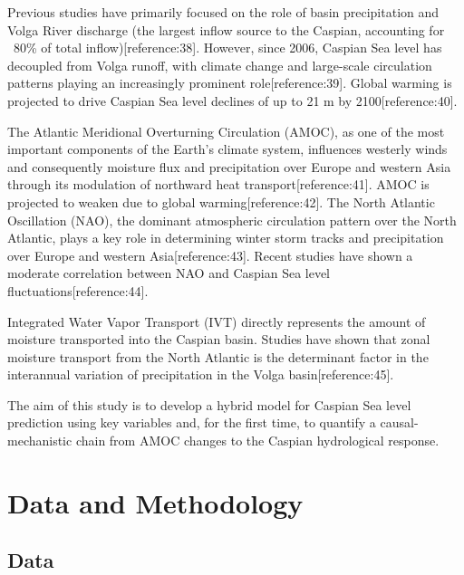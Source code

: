 \documentclass[12pt,letterpaper]{article}
\begin{document}
Previous studies have primarily focused on the role of basin precipitation and Volga River discharge (the largest inflow source to the Caspian, accounting for ~80\% of total inflow)[reference:38]. However, since 2006, Caspian Sea level has decoupled from Volga runoff, with climate change and large-scale circulation patterns playing an increasingly prominent role[reference:39]. Global warming is projected to drive Caspian Sea level declines of up to 21 m by 2100[reference:40].

The Atlantic Meridional Overturning Circulation (AMOC), as one of the most important components of the Earth's climate system, influences westerly winds and consequently moisture flux and precipitation over Europe and western Asia through its modulation of northward heat transport[reference:41]. AMOC is projected to weaken due to global warming[reference:42]. The North Atlantic Oscillation (NAO), the dominant atmospheric circulation pattern over the North Atlantic, plays a key role in determining winter storm tracks and precipitation over Europe and western Asia[reference:43]. Recent studies have shown a moderate correlation between NAO and Caspian Sea level fluctuations[reference:44].

Integrated Water Vapor Transport (IVT) directly represents the amount of moisture transported into the Caspian basin. Studies have shown that zonal moisture transport from the North Atlantic is the determinant factor in the interannual variation of precipitation in the Volga basin[reference:45].

The aim of this study is to develop a hybrid model for Caspian Sea level prediction using key variables and, for the first time, to quantify a causal-mechanistic chain from AMOC changes to the Caspian hydrological response.

\section{Data and Methodology}

\subsection{Data}
\end{document}
